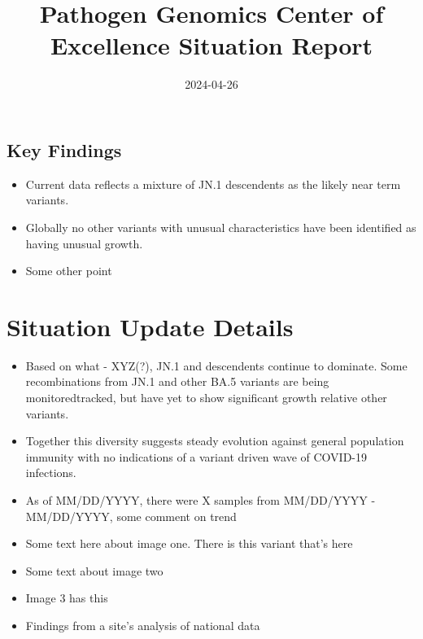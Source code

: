 \documentclass[
  twocolumn]{article}
\title{Pathogen Genomics Center of Excellence Situation Report}
\author{}
\date{2024-04-26}
\providecommand{\tightlist}{%
  \setlength{\itemsep}{0pt}\setlength{\parskip}{0pt}}\usepackage{longtable,booktabs,array}
\begin{document}
\maketitle

\begin{special}

\section{Key Findings}\label{key-findings}

\begin{itemize}
\tightlist
\item
  Current data reflects a mixture of JN.1 descendents as the likely near
  term variants.\\
\item
  Globally no other variants with unusual characteristics have been
  identified as having unusual growth.
\item
  Some other point
\end{itemize}

\end{special}

\section{Situation Update Details}\label{situation-update-details}

\begin{itemize}
\tightlist
\item
  Based on what - XYZ(?), JN.1 and descendents continue to dominate.
  Some recombinations from JN.1 and other BA.5 variants are being
  monitoredtracked, but have yet to show significant growth relative
  other variants.
\item
  Together this diversity suggests steady evolution against general
  population immunity with no indications of a variant driven wave of
  COVID-19 infections.
\item
  As of MM/DD/YYYY, there were X samples from MM/DD/YYYY - MM/DD/YYYY,
  some comment on trend
\item
  Some text here about image one. There is this variant that's here
\item
  Some text about image two
\item
  Image 3 has this
\item
  Findings from a site's analysis of national data
\end{itemize}
\end{document}

